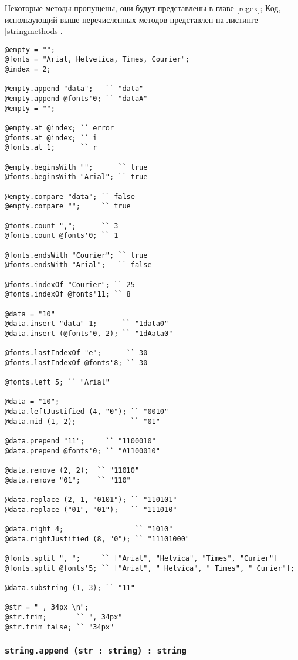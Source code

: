 Некоторые методы пропущены, они будут представлены в главе \ref{regex}; Код, использующий выше перечисленных методов представлен на листинге \ref{stringmethods}.

\begin{lstlisting}[caption=Методы класса string, label=stringmethods]
@empty = "";
@fonts = "Arial, Helvetica, Times, Courier";
@index = 2;

@empty.append "data";   `` "data"
@empty.append @fonts'0; `` "dataA"
@empty = "";

@empty.at @index; `` error
@fonts.at @index; `` i
@fonts.at 1;	  `` r

@empty.beginsWith "";      `` true
@fonts.beginsWith "Arial"; `` true

@empty.compare "data"; `` false
@empty.compare "";     `` true

@fonts.count ",";      `` 3
@fonts.count @fonts'0; `` 1

@fonts.endsWith "Courier"; `` true
@fonts.endsWith "Arial";   `` false

@fonts.indexOf "Courier"; `` 25
@fonts.indexOf @fonts'11; `` 8

@data = "10"
@data.insert "data" 1;      `` "1data0"
@data.insert (@fonts'0, 2); `` "1dAata0"

@fonts.lastIndexOf "e";      `` 30
@fonts.lastIndexOf @fonts'8; `` 30

@fonts.left 5; `` "Arial"

@data = "10";
@data.leftJustified (4, "0"); `` "0010"
@data.mid (1, 2);             `` "01"

@data.prepend "11";     `` "1100010"
@data.prepend @fonts'0; `` "A1100010"

@data.remove (2, 2);  `` "11010"
@data.remove "01";    `` "110"

@data.replace (2, 1, "0101"); `` "110101"
@data.replace ("01", "01");   `` "111010"

@data.right 4; 				   `` "1010"
@data.rightJustified (8, "0"); `` "11101000"

@fonts.split ", ";     `` ["Arial", "Helvica", "Times", "Curier"]
@fonts.split @fonts'5; `` ["Arial", " Helvica", " Times", " Curier"];

@data.substring (1, 3); `` "11"

@str = " , 34px \n";
@str.trim;       `` ", 34px"
@str.trim false; `` "34px"
\end{lstlisting}

\subsubsection{\lstinline|string.append (str : string) : string|}

